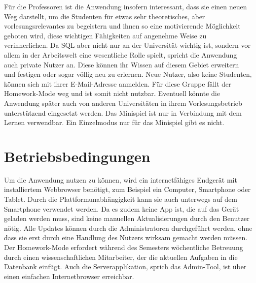 Für die Professoren ist die Anwendung insofern interessant, dass sie einen neuen Weg darstellt, um die Studenten für etwas sehr theoretisches, aber vorlesungsrelevantes 
zu begeistern und ihnen so eine motivierende Möglichkeit geboten wird, diese wichtigen Fähigkeiten auf angenehme Weise zu verinnerlichen. Da SQL aber nicht nur an der 
Universität wichtig ist, sondern vor allem in der Arbeitswelt eine wesentliche Rolle spielt, spricht die Anwendung auch private Nutzer an. Diese können ihr Wissen auf diesem 
Gebiet erweitern und festigen oder sogar völlig neu zu erlernen.
Neue Nutzer, also keine Studenten, können sich mit ihrer E-Mail-Adresse anmelden. Für diese Gruppe fällt der Homework-Mode weg und ist somit nicht nutzbar. Eventuell 
könnte die Anwendung später auch von anderen Universitäten in ihrem Vorlesungsbetrieb unterstützend eingesetzt werden.
Das Minispiel ist nur in Verbindung mit dem Lernen verwendbar. Ein Einzelmodus nur für das Minispiel gibt es nicht.


\section{Betriebsbedingungen}
Um die Anwendung nutzen zu können, wird ein internetfähiges Endgerät mit installiertem Webbrowser benötigt, zum Beispiel ein Computer, Smartphone oder Tablet.
Durch die Plattformunabhängigkeit kann sie auch unterwegs auf dem Smartphone verwendet werden.
Da es zudem keine App ist, die auf das Gerät geladen werden muss, sind keine manuellen Aktualisierungen durch den Benutzer nötig. Alle Updates können durch die 
Administratoren durchgeführt werden, ohne dass sie erst durch eine Handlung des Nutzers wirksam gemacht werden müssen.
Der Homework-Mode erfordert während des Semesters wöchentliche Betreuung durch einen wissenschaftlichen Mitarbeiter, der die aktuellen Aufgaben in die Datenbank einfügt.
Auch die Serverapplikation, sprich das Admin-Tool, ist \"uber einen einfachen Internetbrowser erreichbar.


